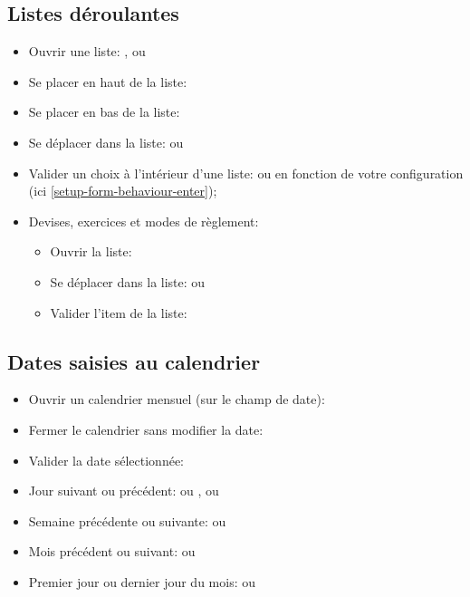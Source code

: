 \subsection{Listes déroulantes}

\begin{itemize}
	\item Ouvrir une liste: ,  ou \keys{\arrowkeydown}
	\item Se placer en haut de la liste: 
	\item Se placer en bas de la liste: 
	\item Se déplacer dans la liste: \keys{\arrowkeyup} ou \keys{\arrowkeydown}
	\item Valider un choix à l'intérieur d'une liste:  ou  en fonction de votre configuration (ici \vref{setup-form-behaviour-enter});
	\item Devises, exercices et modes de règlement:
		\begin{itemize}
			\item Ouvrir la liste: 
			\item Se déplacer dans la liste: \keys{\arrowkeyup} ou \keys{\arrowkeydown}
			\item Valider l'item de la liste: 
		\end{itemize}
\end{itemize}


\subsection{Dates saisies au calendrier}

\begin{itemize}
	\item Ouvrir un calendrier mensuel (sur le champ de date): 
	\item Fermer le calendrier sans modifier la date: 
	\item Valider la date sélectionnée: 
	\item Jour suivant ou précédent: \keys{{+}} ou \keys{{-}}, \keys{\arrowkeyright} ou \keys{\arrowkeyleft}
	\item Semaine précédente ou suivante: \keys{\arrowkeyup} ou \keys{\arrowkeydown}
	\item Mois précédent ou suivant:  ou 
	\item Premier jour ou dernier jour du mois:  ou 
\end{itemize}


